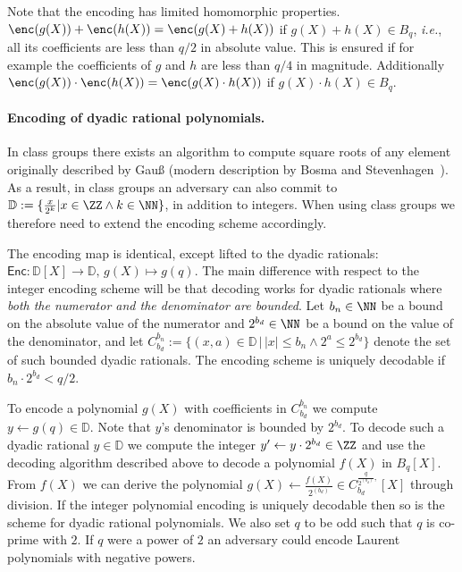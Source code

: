 \documentclass{article}
\theoremstyle{definition}
\begin{document}
Note that the encoding has limited homomorphic properties. $\enc(g(X))+\enc(h(X))=\enc(g(X)+h(X))$ if $g(X)+h(X)\in B_{q}$, \emph{i.e.}, all its coefficients are less than $q/2$ in absolute value. This is ensured if for example the coefficients of $g$ and $h$ are less than $q/4$ in magnitude. Additionally $\enc(g(X))\cdot \enc(h(X))=\enc(g(X)\cdot h(X))$ if $g(X)\cdot h(X)\in B_{q}$.

\paragraph{Encoding of dyadic rational polynomials.}
In class groups there exists an algorithm to compute square roots of any element originally described by Gauß (modern description by Bosma and Stevenhagen~\cite{bosma1996computation}). As a result, in class groups an adversary can also commit to  $\mathbb{D}:=\{\frac{x}{2^k} |x \in \ZZ \wedge k \in \NN\}$, in addition to integers. When using class groups we therefore need to extend the encoding scheme accordingly. 

The encoding map is identical, except lifted to the dyadic rationals: $\mathsf{Enc} : \mathbb{D}[X] \rightarrow \mathbb{D}, \, g(X) \mapsto g(q)$. The main difference with respect to the integer encoding scheme will be that decoding works for dyadic rationals where \emph{both the numerator and the denominator are bounded}. Let $b_n \in \NN$ be a bound on the absolute value of the numerator and $2^{b_d}\in \NN$ be a bound on the value of the denominator, and let $C_{b_d}^{b_n}:=\{(x,a) \in \mathbb{D} \, | \, |x|\leq b_n \wedge 2^a\leq 2^{b_d}\}$ denote the set of such bounded dyadic rationals. The encoding scheme is uniquely decodable if $b_n\cdot 2^{b_d}<q/2$.
 
To encode a polynomial $g(X)$ with coefficients in $C_{b_d}^{b_n}$ we compute $y \gets g(q)\in \mathbb{D}$. Note that $y$'s denominator is bounded by $2^{b_d}$. To decode such a dyadic rational $y\in \mathbb{D}$ we compute the integer $y'\gets y\cdot 2^{b_d}\in \ZZ$  and use the decoding algorithm described above to decode a polynomial $f(X)$ in $B_{q}[X]$. From $f(X)$ we can derive the polynomial  $g(X)\gets \frac{f(X)}{2^{(b_d)}} \in C^{\frac{q}{2^{(b_d)}},}_{b_d}[X]$ through division. If the integer polynomial encoding is uniquely decodable then so is the scheme for dyadic rational polynomials.
We also set $q$ to be odd such that $q$ is co-prime with $2$. If $q$ were a power of $2$ an adversary could encode Laurent polynomials with negative powers.
\end{document}
